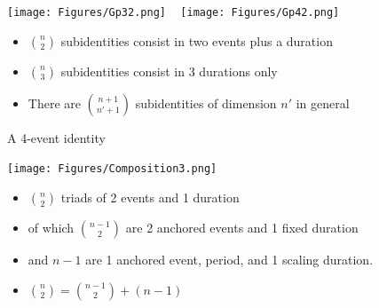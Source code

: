 \documentclass[20pt]{beamer}
\begin{document}
\begin{frame}[plain]
\begin{center}
\Large
\texttt{[image: Figures/Gp32.png]} ~
\texttt{[image: Figures/Gp42.png]} 
\begin{itemize}[<+->]
  \item $\binom{n}{2}$ subidentities consist in two events plus a duration
  \item $\binom{n}{3}$ subidentities consist in 3 durations only
  \item There are $\binom{n+1}{n'+1}$ subidentities of dimension $n'$ in general
\end{itemize}

\end{center}

\end{frame}


\begin{frame}[plain]
\Large

\begin{center}

A 4-event identity
\end{center}

\end{frame}


\begin{frame}[plain]
\Large

\begin{center}
\texttt{[image: Figures/Composition3.png]}
\end{center}
\begin{itemize}[<+->]
  \item $\binom{n}{2}$ triads of 2 events and 1 duration
  \item of which $\binom{n-1}{2}$ are 2 anchored events and 1 fixed duration
  \item and $n-1$ are 1 anchored event, period, and 1 scaling duration.
  \item $\binom{n}{2} = \binom{n-1}{2} + (n-1)$
\end{itemize}
\end{frame}

\end{document}
